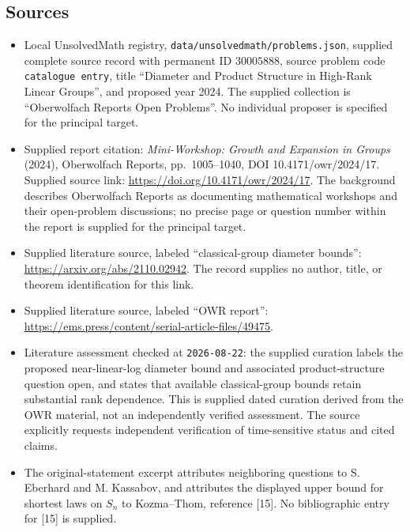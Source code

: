 \documentclass[11pt]{article}
\begin{document}
\subsection{Sources}
\begin{itemize}
\item Local UnsolvedMath registry, \texttt{data/unsolvedmath/problems.json}, supplied complete source record with permanent ID \(30005888\), source problem code \texttt{catalogue entry}, title ``Diameter and Product Structure in High-Rank Linear Groups'', and proposed year 2024. The supplied collection is ``Oberwolfach Reports Open Problems''. No individual proposer is specified for the principal target.
\item Supplied report citation: \emph{Mini-Workshop: Growth and Expansion in Groups} (2024), Oberwolfach Reports, pp.\ 1005--1040, DOI 10.4171/owr/2024/17. Supplied source link: \url{https://doi.org/10.4171/owr/2024/17}. The background describes Oberwolfach Reports as documenting mathematical workshops and their open-problem discussions; no precise page or question number within the report is supplied for the principal target.
\item Supplied literature source, labeled ``classical-group diameter bounds'': \url{https://arxiv.org/abs/2110.02942}. The record supplies no author, title, or theorem identification for this link.
\item Supplied literature source, labeled ``OWR report'': \url{https://ems.press/content/serial-article-files/49475}.
\item Literature assessment checked at \texttt{2026-08-22}: the supplied curation labels the proposed near-linear-log diameter bound and associated product-structure question open, and states that available classical-group bounds retain substantial rank dependence. This is supplied dated curation derived from the OWR material, not an independently verified assessment. The source explicitly requests independent verification of time-sensitive status and cited claims.
\item The original-statement excerpt attributes neighboring questions to S. Eberhard and M. Kassabov, and attributes the displayed upper bound for shortest laws on \(S_n\) to Kozma--Thom, reference [15]. No bibliographic entry for [15] is supplied.
\end{itemize}
\end{document}
